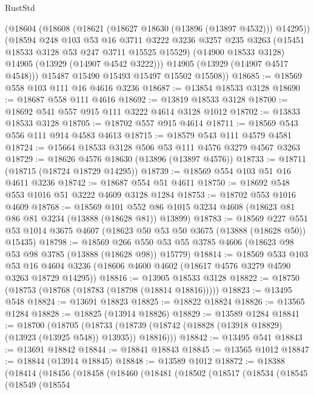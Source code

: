 \begin{lexlean}{RustStd}
\begin{coremodule}
        (@18604
          (@18608 (@18621 (@18627 @18630 (@13896 (@13897 @4532))) @14295))
          (@18594
            @248
            @103
            @53
            @16
            @3711
            @3222
            @3236
            @3257
            @235
            @3263
            (@15451 @18533 @3128 @53 @247 @3711 @15525 @15529)
            (@14900 @18533 @3128)
            @14905
            (@13929 (@14907 @4542 @3222)))
          @14905
          (@13929 (@14907 @4517 @4548)))
        @15487
        @15490
        @15493
        @15497
        @15502
        @15508))
@18685 := @18569 @558 @103 @111 @16 @4616 @3236
@18687 := @13854 @18533 @3128
@18690 := @18687 @558 @111 @4616
@18692 := @13819 @18533 @3128
@18700 := @18692 @541 @557 @915 @111 @3222 @4614 @3128 @1012
@18702 := @13833 @18533 @3128
@18705 := @18702 @557 @915 @4614
@18711 := @18569 @543 @556 @111 @914 @4583 @4613
@18715 := @18579 @543 @111 @4579 @4581
@18724 := @15664 @18533 @3128 @506 @53 @111 @4576 @3279 @4567 @3263
@18729 := @18626 @4576 @18630 (@13896 (@13897 @4576))
@18733 := @18711 (@18715 (@18724 @18729 @14295))
@18739 := @18569 @554 @103 @51 @16 @4611 @3236
@18742 := @18687 @554 @51 @4611
@18750 := @18692 @548 @553 @1016 @51 @3222 @4609 @3128 @1284
@18753 := @18702 @553 @1016 @4609
@18768 := @18569
    @101
    @552
    @86
    @1015
    @3234
    @4608
    (@18623 @81 @86 @81 @3234 (@13888 (@18628 @81)) @13899)
@18783 := @18569
    @227
    @551
    @53
    @1014
    @3675
    @4607
    (@18623 @50 @53 @50 @3675 (@13888 (@18628 @50)) @15435)
@18798 := @18569
    @266
    @550
    @53
    @55
    @3785
    @4606
    (@18623 @98 @53 @98 @3785 (@13888 (@18628 @98)) @15779)
@18814 := @18569
    @533
    @103
    @53
    @16
    @4604
    @3236
    (@18606 @4600 @4602 (@18617 @4576 @3279 @4590 @3263 @18729 @14295))
@18816 := @13905 @18533 @3128
@18822 := @18750 (@18753 (@18768 (@18783 (@18798 (@18814 @18816)))))
@18823 := @13495 @548
@18824 := @13691 @18823
@18825 := @18822 @18824
@18826 := @13565 @1284
@18828 := @18825 (@13914 @18826)
@18829 := @13589 @1284
@18841 := @18700
    (@18705
      (@18733 (@18739 (@18742 (@18828 (@13918 @18829) (@13923 (@13925 @548)) @13935)) @18816)))
@18842 := @13495 @541
@18843 := @13691 @18842
@18844 := @18841 @18843
@18845 := @13565 @1012
@18847 := @18844 (@13914 @18845)
@18848 := @13589 @1012
@18872 := @18388
    (@18414
      (@18456
        (@18458
          (@18460
            (@18481
              (@18502
                (@18517
                  (@18534
                    (@18545
                      (@18549
                        (@18554

\end{coremodule}
\end{lexlean}
